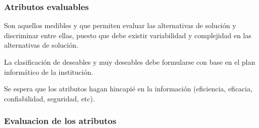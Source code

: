 \documentclass{templateNote}
\begin{document}
\subsubsection*{Atributos evaluables}
Son aquellos medibles y que permiten evaluar las alternativas de solución y discriminar entre ellas, puesto que debe existir variabilidad y complejidad en las alternativas de solución. 

La clasificación de deseables y muy deseables debe formularse con base en el plan informático de la institución.

Se espera que los atributos hagan hincapié en la información (eficiencia, eficacia, confiabilidad, seguridad, etc).

\newpage
\subsubsection*{Evaluacion de los atributos}
\end{document}
